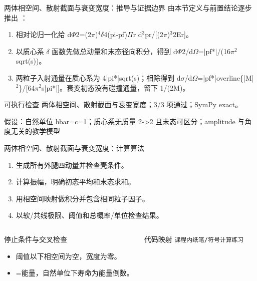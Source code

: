 \begin{frame}[t]{两体相空间、散射截面与衰变宽度：推导与证据边界}
\footnotesize
{}\quad 由本节定义与前置结论逐步推出 ：
\begin{enumerate}
\item 相对论归一化给 d\ensuremath{\Phi}2=(2\ensuremath{\pi})\ensuremath{^{4}}\ensuremath{\delta}4(pi-pf)\ensuremath{\Pi}r d\ensuremath{^{3}}pr/\allowbreak{}[(2\ensuremath{\pi})\ensuremath{^{3}}2Er]。
\item 以质心系 \ensuremath{\delta} 函数先做总动量和末态径向积分，得到 d\ensuremath{\Phi}2/\allowbreak{}d\ensuremath{\Omega}=|pf*|/\allowbreak{}(16\ensuremath{\pi}\ensuremath{^{2}}sqrt(s))。
\item 两粒子入射通量在质心系为 4|pi*|sqrt(s)；相除得到 d\ensuremath{\sigma}/\allowbreak{}d\ensuremath{\Omega}=|pf*|overline\{|M|\ensuremath{^{2}}\}/\allowbreak{}[64\ensuremath{\pi}\ensuremath{^{2}}s|pi*|]。衰变初态没有碰撞通量，留下 1/\allowbreak{}(2M)。
\end{enumerate}\begin{block}{可执行检查}
\quad 两体相空间、散射截面与衰变宽度；3/3 项通过；SymPy exact。
\par\scriptsize 假设：自然单位 hbar=c=1；质心系无质量 2->2 且末态可区分；amplitude 与角度无关的教学模型
\end{block}
\end{frame}

\begin{frame}[t]{两体相空间、散射截面与衰变宽度：计算算法}
\footnotesize
{}\begin{enumerate}
\item 生成所有外腿四动量并检查壳条件。
\item 计算振幅，明确初态平均和末态求和。
\item 用相空间映射做积分并包含相同粒子因子。
\item 以软/\allowbreak{}共线极限、阈值和总概率/\allowbreak{}单位检查结果。
\end{enumerate}\begin{columns}[T,onlytextwidth]
\begin{block}{停止条件与交叉检查}\scriptsize\begin{itemize}
\item[\CheckMark] 阈值以下相空间为空，宽度为零。
\item[\CheckMark] [Gamma]=能量，自然单位下寿命为能量倒数。
\end{itemize}\end{block}
\begin{block}{代码映射}
\scriptsize \texttt{课程内纸笔/\allowbreak{}符号计算练习}
\end{block}\end{columns}\end{frame}

